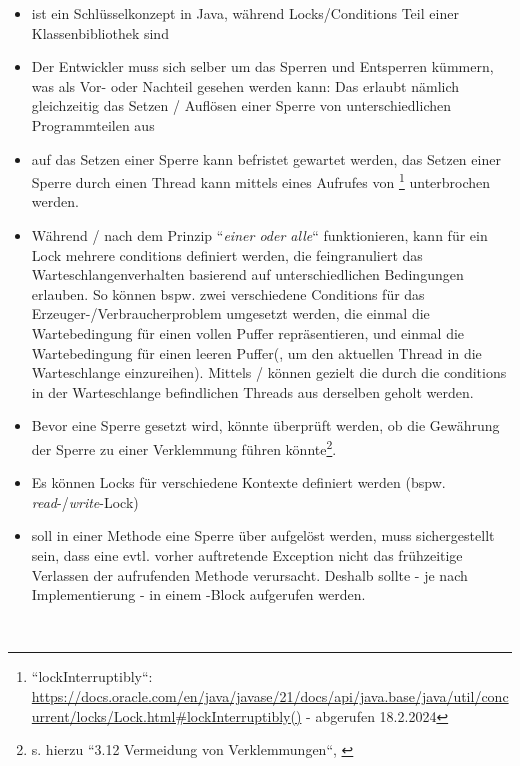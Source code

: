 \begin{tcolorbox}[title={Vor- und Nachteile von locks u. conditions}]
\begin{itemize}
    \item {} ist ein Schlüsselkonzept in Java, während Locks/Conditions Teil einer Klassenbibliothek sind
    \item Der Entwickler muss sich selber um das Sperren und Entsperren kümmern, was als Vor- oder Nachteil gesehen werden kann:
    Das erlaubt nämlich gleichzeitig das Setzen / Auflösen einer Sperre von unterschiedlichen Programmteilen aus
    \item auf das Setzen einer Sperre kann befristet gewartet werden, das Setzen einer Sperre durch einen Thread kann mittels eines Aufrufes von \footnote{
        ``lockInterruptibly``: \url{https://docs.oracle.com/en/java/javase/21/docs/api/java.base/java/util/concurrent/locks/Lock.html#lockInterruptibly()} - abgerufen 18.2.2024
    } unterbrochen werden.
    \item Während / nach dem Prinzip ``\textit{einer oder alle}`` funktionieren, kann für ein Lock mehrere conditions definiert werden, die feingranuliert das Warteschlangenverhalten basierend auf unterschiedlichen Bedingungen erlauben.
     So können bspw. zwei verschiedene Conditions für das Erzeuger-/Verbraucherproblem umgesetzt werden, die einmal die Wartebedingung für einen vollen Puffer repräsentieren, und einmal die Wartebedingung für einen leeren Puffer(, um den aktuellen Thread in die Warteschlange einzureihen).
     Mittels  /  können gezielt die durch die conditions in der Warteschlange befindlichen Threads aus derselben geholt werden.
    \item Bevor eine Sperre gesetzt wird, könnte überprüft werden, ob die Gewährung der Sperre zu einer Verklemmung führen könnte\footnote{s. hierzu ``3.12 Vermeidung von Verklemmungen``, \cite[192 ff.]{Oec22}}.
    \item Es können Locks für verschiedene Kontexte definiert werden (bspw. \textit{read}-/\textit{write}-Lock)
    \item soll in einer Methode eine Sperre über  aufgelöst werden, muss sichergestellt sein, dass eine evtl. vorher auftretende Exception nicht das frühzeitige Verlassen der aufrufenden Methode verursacht.
    Deshalb sollte  - je nach Implementierung - in einem -Block aufgerufen werden.
\end{itemize}
\end{tcolorbox}\\


